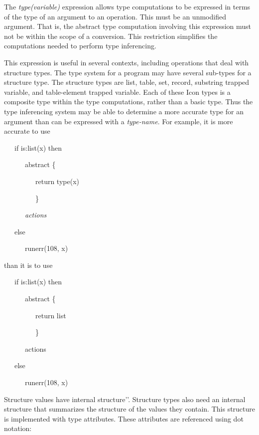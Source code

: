 The \textit{type(variable)} expression allows type computations to be
expressed in terms of the type of an argument to an operation. This
must be an unmodified argument. That is, the abstract type computation
involving this expression must not be within the scope of a
conversion. This restriction simplifies the computations needed to
perform type inferencing.

This expression is useful in several contexts, including operations
that deal with structure types. The type system for a program may have
several sub-types for a structure type. The structure types are list,
table, set, record, substring trapped variable, and table-element
trapped variable. Each of these Icon types is a composite type within
the type computations, rather than a basic type. Thus the type
inferencing system may be able to determine a more accurate type for
an argument than can be expressed with a \textit{type-name}. For
example, it is more accurate to use

{\ttfamily\mdseries
\ \ \ if is:list(x) then}

{\ttfamily\mdseries
\ \ \ \ \ \ abstract \{}

{\ttfamily\mdseries
\ \ \ \ \ \ \ \ \ return type(x)}

{\ttfamily\mdseries
\ \ \ \ \ \ \ \ \ \}}

{\ttfamily\mdseries
\ \ \ \ \ \ \textit{actions}}

{\ttfamily\mdseries
\ \ \ else}

{\ttfamily\mdseries
\ \ \ \ \ \ runerr(108, x)}


than it is to use 

{\ttfamily\mdseries
\ \ \ if is:list(x) then}

{\ttfamily\mdseries
\ \ \ \ \ \ abstract \{}

{\ttfamily\mdseries
\ \ \ \ \ \ \ \ \ return list}

{\ttfamily\mdseries
\ \ \ \ \ \ \ \ \ \}}

{\ttfamily\mdseries
\ \ \ \ \ \ actions}

{\ttfamily\mdseries
\ \ \ else}

{\ttfamily\mdseries
\ \ \ \ \ \ runerr(108, x)}


Structure values have internal
{\textasciigrave}{\textasciigrave}structure'{}'. Structure types also
need an internal structure that summarizes the structure of the values
they contain. This structure is implemented with type attributes.
These attributes are referenced using dot notation:

